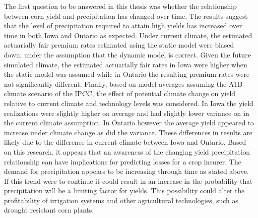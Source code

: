 The first question to be answered in this thesis was whether the relationship between corn yield and precipitation has changed over time. The results suggest that the level of precipitation required to attain high yields has increased over time in both Iowa and Ontario as expected. Under current climate, the estimated actuarially fair premium rates estimated using the static model were biased down, under the assumption that the dynamic model is correct. Given the future simulated climate, the estimated actuarially fair rates in Iowa were higher when the static model was assumed while in Ontario the resulting premium rates were not significantly different. Finally, based on model averages assuming the A1B climate scenario of the IPCC, the effect of potential climate change on yield relative to current climate and technology levels was considered. In Iowa the yield realizations were slightly higher on average and had slightly lower variance on in the current climate assumption. In Ontario however the average yield appeared to increase under climate change as did the variance. These differences in results are likely due to the difference in current climate between Iowa and Ontario. Based on this research, it appears that an awareness of the changing yield precipitation relationship can have implications for predicting losses for a crop insurer. The demand for precipitation appears to be increasing through time as stated above. If this trend were to continue it could result in an increase in the probability that precipitation will be a limiting factor for yields. This possibility could alter the profitability of irrigation systems and other agricultural technologies, such as drought resistant corn plants. 

